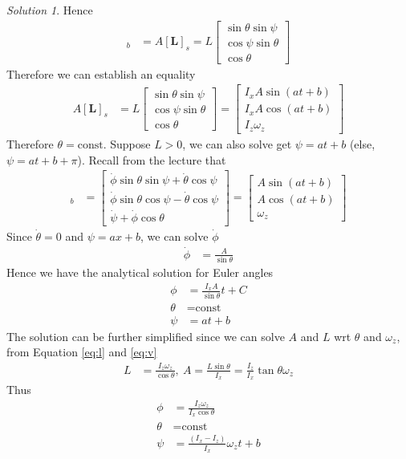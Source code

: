 \documentclass[twoside,11pt]{article}
\theoremstyle{definition}
\theoremstyle{remark}
\newtheorem*{solution}{Solution}
\begin{document}
\begin{solution}
Hence 
\begin{align*}
    [\mathbf{L}]_b &= A[\mathbf{L}]_s
    = L\begin{bmatrix}
        \sin\theta\sin\psi \\
        \cos\psi\sin\theta\\
        \cos\theta
    \end{bmatrix}
\end{align*}
Therefore we can establish an equality
\begin{align}
    A[\mathbf{L}]_s
    &= L\begin{bmatrix}
        \sin\theta\sin\psi \\
        \cos\psi\sin\theta\\
        \cos\theta
    \end{bmatrix}
    = \begin{bmatrix}
        I_x A\sin(at+b)\\
        I_x A\cos(at+b)\\
        I_z\omega_z
    \end{bmatrix}
    \label{eq:l}
\end{align}
Therefore $\theta=\text{const}$.
Suppose $L>0$, we can also solve get $\psi=at+b$ (else, $\psi=at+b+\pi$).
Recall from the lecture that
\begin{align}
    [\symbfit\omega]_b &= 
    \begin{bmatrix}
        \dot\phi\sin\theta\sin\psi + \dot\theta\cos\psi\\
        \dot\phi\sin\theta\cos\psi - \dot\theta\cos\psi\\
        \dot\psi + \dot\phi\cos\theta
    \end{bmatrix}
    = \begin{bmatrix}
        A\sin(at+b)\\
        A\cos(at+b)\\
        \omega_z
    \end{bmatrix}
    \label{eq:v}
\end{align}
Since $\dot\theta = 0$ and $\psi=ax+b$, we can solve $\dot\phi$
\begin{align*}
    \dot\phi &= \frac{A}{\sin\theta}
\end{align*}
Hence we have the analytical solution for Euler angles
\begin{align*}
    \phi   &= \frac{I_xA}{\sin\theta}t + C \\
    \theta &= \text{const} \\
    \psi   &= at + b
\end{align*}
The solution can be further simplified since we can solve $A$ and $L$ wrt $\theta$
and $\omega_z$, from Equation \ref{eq:l} and \ref{eq:v}
\begin{align*}
    L &= \frac{I_z\omega_z}{\cos\theta},~
    A = \frac{L\sin\theta}{I_x} = \frac{I_z}{I_x}\tan\theta\omega_z
\end{align*}
Thus
\begin{align*}
    \phi   &= \frac{I_z\omega_z}{I_x \cos\theta} \\
    \theta &= \text{const} \\
    \psi   &= \frac{(I_x-I_z)}{I_x}\omega_z t + b
\end{align*}

\end{solution}


\end{document}

